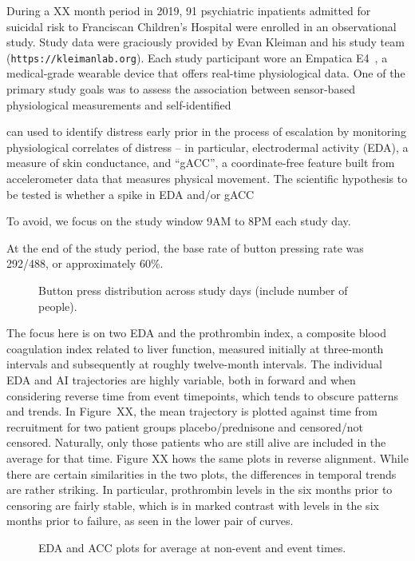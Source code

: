 \documentclass[11pt]{amsart}
\begin{document}
During a XX month period in 2019, 91 psychiatric inpatients admitted for suicidal risk to Franciscan Children's Hospital were enrolled in an observational study.  Study data were graciously provided by Evan Kleiman and his study team ({\tt https://kleimanlab.org}). Each study participant wore an Empatica E4~\cite{empaticae3}, a medical-grade wearable device that offers real-time physiological data.  One of the primary study goals was to assess the association between sensor-based physiological measurements and self-identified

can used to identify distress early prior in the process of escalation by monitoring physiological correlates of distress -- in particular, electrodermal activity (EDA), a measure of skin conductance, and ``gACC'', a coordinate-free feature built from accelerometer data that measures physical movement. The scientific hypothesis to be tested is whether a spike in EDA and/or gACC

To avoid, we focus on the study window 9AM to 8PM each study day.

At the end of the study period, the base rate of button pressing  rate was 292/488, or
approximately 60\%.

\begin{figure}[!th]
\caption{Button press distribution across study days (include number of people).}
\end{figure}

The focus here is on two EDA and the  prothrombin index, a composite
blood coagulation index
related to liver function, measured initially at three-month intervals
and subsequently at roughly twelve-month intervals.
The individual EDA and AI trajectories are highly variable, both in forward and when considering reverse time from event timepoints, which tends to obscure patterns and trends.  In Figure~XX, the mean trajectory is plotted against time from recruitment for two patient groups placebo/prednisone and censored/not censored. Naturally, only those patients who are still alive are included in the average
for that time.
Figure XX hows the same plots in reverse alignment.
While there are certain similarities in the two plots,
the differences in temporal trends are rather striking.
In particular, prothrombin levels in the six months prior to censoring are fairly stable,
which is in marked contrast with levels in the six months prior to failure,
as seen in the lower pair of curves.

\begin{figure}[!th]
\caption{EDA and ACC plots for average at non-event and event times.}
\end{figure}
\end{document}
